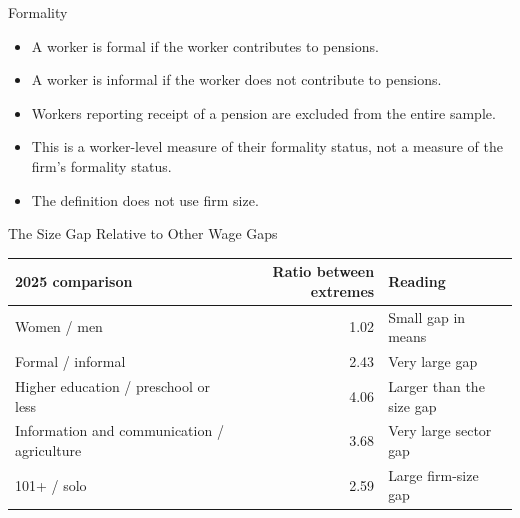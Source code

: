 \begin{frame}{Formality}

  \vspace{0.35cm}
  \begin{itemize}
    \item A worker is formal if the worker contributes to pensions.
    \item A worker is informal if the worker does not contribute to pensions.
    \item Workers reporting receipt of a pension are excluded from the entire sample.
    \item This is a worker-level measure of their formality status, not a measure of the firm's formality status.
    \item The definition does not use firm size.
  \end{itemize}
\end{frame}

\begin{frame}{The Size Gap Relative to Other Wage Gaps}

  \vspace{0.25cm}
  \begin{center}
  \scriptsize
  \setlength{\tabcolsep}{3pt}
  \begin{tabular}{p{}rp{}}
    \toprule
    2025 comparison & Ratio between extremes & Reading \\
    \midrule
    Women / men & 1.02 & Small gap in means \\
    Formal / informal & 2.43 & Very large gap \\
    Higher education / preschool or less & 4.06 & Larger than the size gap \\
    Information and communication / agriculture & 3.68 & Very large sector gap \\
    101+ / solo & 2.59 & Large firm-size gap \\
    \bottomrule
  \end{tabular}
  \end{center}

\end{frame}

